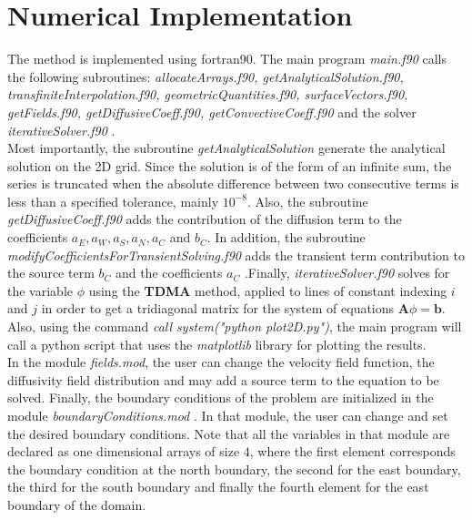 \documentclass[a4paper, 11pt]{article}
\begin{document}
\section*{Numerical Implementation}
The method is implemented using fortran90. The main program \textit{main.f90} calls the following subroutines: \textit{allocateArrays.f90, getAnalyticalSolution.f90, transfiniteInterpolation.f90, geometricQuantities.f90, surfaceVectors.f90, getFields.f90, getDiffusiveCoeff.f90, getConvectiveCoeff.f90} and the solver \textit{iterativeSolver.f90} . \\
Most importantly, the subroutine \textit{getAnalyticalSolution} generate the analytical solution on the 2D grid. Since the solution is of the form of an infinite sum, the series is truncated when the absolute difference between two consecutive terms is less than a specified tolerance, mainly $10^{-8}$. Also, the subroutine \textit{getDiffusiveCoeff.f90} adds the contribution of the diffusion term to the coefficients $a_E, a_W, a_S, a_N, a_C$ and $b_C$. In addition, the subroutine \textit{modifyCoefficientsForTransientSolving.f90} adds the transient term contribution to the source term $b_C$ and the coefficients $a_C$ .Finally, \textit{iterativeSolver.f90} solves for the variable $\phi$ using the \textbf{TDMA} method, applied to lines of constant indexing $i$ and $j$ in order to get a tridiagonal matrix for the system of equations $\textbf{A}\phi=\textbf{b}$. \\ 
Also, using the command \textit{call system("python plot2D.py")}, the main program will call a python script that uses the \textit{matplotlib} library for plotting the results.\\
In the module \textit{fields.mod}, the user can change the velocity field function, the diffusivity field distribution and may add a source term to the equation to be solved. Finally, the boundary conditions of the problem are initialized in the module \textit{boundaryConditions.mod} . In that module, the user can change and set the desired boundary conditions. Note that all the variables in that module are declared as one dimensional arrays of size $4$, where the first element corresponds the boundary condition at the north boundary, the second for the east boundary, the third for the south boundary and finally the fourth element for the east boundary of the domain.
\end{document}
